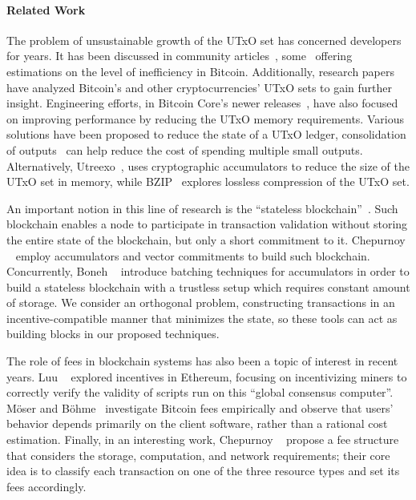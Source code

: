 \paragraph{Related Work}
The problem of unsustainable growth of the UTxO set has concerned developers
for years. It has been discussed in community
articles~\cite{bitcoin-mag-utxo,state-growth-problem},
some~\cite{andresen-utxo} offering estimations on the level of inefficiency in
Bitcoin. Additionally, research
papers~\cite{EPRINT:PDNH18,EPRINT:DPNH17b,houyBitcoin,easley2019mining} have
analyzed Bitcoin's and other cryptocurrencies' UTxO sets to gain further
insight. Engineering efforts, \eg in Bitcoin Core's newer
releases~\cite{maxwell-core}, have also focused on improving performance by
reducing the UTxO memory requirements. Various solutions have been proposed to
reduce the state of a UTxO ledger, \eg consolidation of
outputs~\cite{bitcoin-utxo-consolidate} can help reduce the cost of spending
multiple small outputs. Alternatively, Utreexo~\cite{EPRINT:Dryja19}, uses
cryptographic accumulators to reduce the size of the UTxO set in memory, while
BZIP~\cite{jiang2019bzip} explores lossless compression of the UTxO set.

An important notion in this line of research is the ``stateless
blockchain''~\cite{todd-utxo}. Such blockchain enables a node to participate in
transaction validation without storing the entire state of the blockchain, but
only a short commitment to it. Chepurnoy \etal~\cite{EPRINT:ChePapZha18} employ
accumulators and vector commitments to build such blockchain. Concurrently,
Boneh \etal~\cite{EPRINT:BonBunFis18b} introduce batching techniques for
accumulators in order to build a stateless blockchain with a trustless setup
which requires constant amount of storage. We consider an orthogonal problem,
\ie constructing transactions in an incentive-compatible manner that minimizes
the state, so these tools can act as building blocks in our proposed
techniques.

The role of fees in blockchain systems has also been a topic of interest in
recent years. Luu \etal~\cite{CCS:LTKS15} explored incentives in Ethereum,
focusing on incentivizing miners to correctly verify the validity of scripts
run on this ``global consensus computer''. M{\"o}ser and
B{\"o}hme~\cite{FCW:MosBoh15} investigate Bitcoin fees empirically and observe
that users' behavior depends primarily on the client software, rather than a
rational cost estimation. Finally, in an interesting work, Chepurnoy
\etal~\cite{FCW:CheKhaMes18} propose a fee structure that considers the
storage, computation, and network requirements; their core idea is to classify
each transaction on one of the three resource types and set its fees
accordingly.
